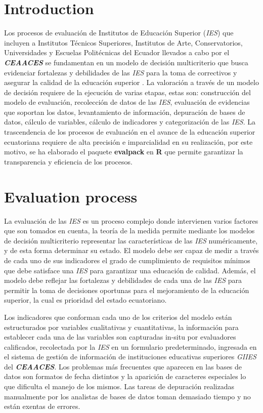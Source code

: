 \section{Introduction}
Los procesos de evaluación de Institutos de Educación Superior ({\it IES}) que incluyen a Institutos
Técnicos Superiores, Institutos de Arte, Conservatorios, Universidades y Escuelas Politécnicas del
Ecuador llevados a cabo por el \textit{\textbf{CEAACES}} se fundamentan en un modelo de decisión
multicriterio que busca evidenciar fortalezas y debilidades de las {\it IES} para la toma de
correctivos y asegurar la calidad de la educación superior \citep{1}. La valoración a través de un
modelo de decisión requiere de la ejecución de varias etapas, estas son: construcción del modelo de
evaluación, recolección de datos de las {\it IES}, evaluación de evidencias que soportan los datos,
levantamiento de información, depuración de bases de datos, cálculo de variables, cálculo de
indicadores y categorización de las {\it IES}. La trascendencia de los procesos de evaluación en el
avance de la educación superior ecuatoriana requiere de alta precisión e imparcialidad en su
realización, por este motivo, se ha elaborado el paquete \textbf{evalpack} en {\bf R } que
permite garantizar la transparencia y eficiencia de los procesos.    


\section{Evaluation process}
La evaluación de las {\it IES} es un proceso complejo donde intervienen varios factores que son
tomados en cuenta, la teoría de la medida permite mediante los modelos de decisión multicriterio
representar las características de las {\it IES} numéricamente\citep{2}, y de esta forma determinar
su estado. El modelo debe ser capaz de medir a través de cada uno de sus indicadores el grado de
cumplimiento de requisitos mínimos que debe satisface una {\it IES} para garantizar una educación de
calidad. Además, el modelo debe reflejar las fortalezas y debilidades de cada una de las {\it IES}
para permitir la toma de decisiones oportunas para el mejoramiento de la educación superior, la cual
es prioridad del estado ecuatoriano.

Los indicadores que conforman cada uno de los criterios del modelo están estructurados por variables
cualitativas y cuantitativas, la información para establecer cada una de las variables son
capturadas in-situ por evaluadores calificados, recolectada por la {\it IES} en un formulario
predeterminado, ingresada en el sistema de gestión de información de instituciones educativas
superiores {\it GIIES} del \textit{\textbf{CEAACES}}. Los problemas más frecuentes que aparecen en
las bases de datos son formatos de fecha distintos y la aparición de caracteres especiales lo que
dificulta el manejo de los mismos. Las tareas de depuración realizadas manualmente por los analistas
de bases de datos toman demasiado tiempo y no están exentas de errores.

